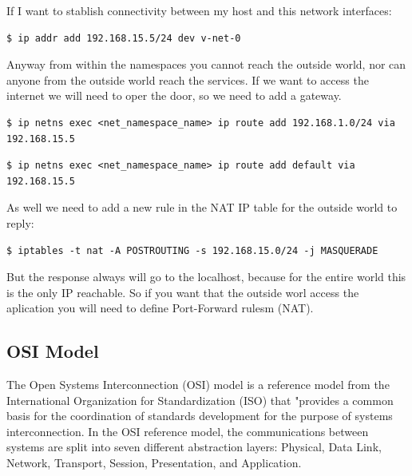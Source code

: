 \documentclass{article}
\newenvironment{codetemplate}[1][]{%
  \mybasecolorbox[#1]
  \itshape
}{%
  \endmybasecolorbox
}
\begin{document}
If I want to stablish connectivity between my host and this network interfaces:
\begin{codetemplate}{}
\begin{verbatim}
$ ip addr add 192.168.15.5/24 dev v-net-0
\end{verbatim}
\end{codetemplate}

Anyway from within the namespaces you cannot reach the outside world, nor can anyone from the outside world reach the services. If we want to access the internet we will need to oper the door, so we need to add a gateway.
\begin{codetemplate}{}
\begin{verbatim}
$ ip netns exec <net_namespace_name> ip route add 192.168.1.0/24 via 192.168.15.5
\end{verbatim}
\end{codetemplate}

\begin{codetemplate}{}
\begin{verbatim}
$ ip netns exec <net_namespace_name> ip route add default via 192.168.15.5
\end{verbatim}
\end{codetemplate}

As well we need to add a new rule in the NAT IP table for the outside world to reply:
\begin{codetemplate}{}
\begin{verbatim}
$ iptables -t nat -A POSTROUTING -s 192.168.15.0/24 -j MASQUERADE
\end{verbatim}
\end{codetemplate}

But the response always will go to the localhost, because for the entire world this is the only IP reachable. So if you want that the outside worl access the aplication you will need to define Port-Forward rulesm (NAT).


\subsection{OSI Model}

The Open Systems Interconnection (OSI) model is a reference model from the International Organization for Standardization (ISO) that "provides a common basis for the coordination of standards development for the purpose of systems interconnection. In the OSI reference model, the communications between systems are split into seven different abstraction layers: Physical, Data Link, Network, Transport, Session, Presentation, and Application.
\end{document}
